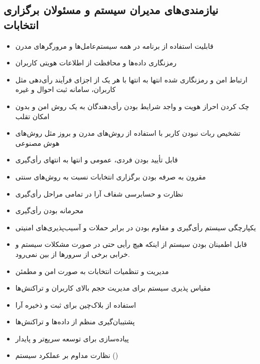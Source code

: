 \documentclass[12pt]{article}
\begin{document}
\subsection{نیازمندی‌های مدیران سیستم و مسئولان برگزاری انتخابات}
\begin{itemize}[leftmargin=*]
\item
قابلیت استفاده از برنامه در همه سیستم‌عامل‌ها و مرورگرهای مدرن
\item
رمزنگاری داده‌ها و محافظت از اطلاعات هویتی کاربران
\item
ارتباط امن و رمزنگاری شده انتها به انتها با هر یک از اجزای فرآیند رأی‌دهی مثل کاربران، سامانه ثبت احوال و غیره 
\item
چک کردن احراز هویت و واجد شرایط بودن رأی‌دهندگان به یک روش امن و بدون امکان تقلب
\item
تشخیص ربات نبودن کاربر با استفاده از روش‌های مدرن و بروز مثل روش‌های هوش مصنوعی
\item
قابل تأیید بودن فردی، عمومی و انتها به انتهای رأی‌گیری
\item
مقرون به صرفه بودن برگزاری انتخابات نسبت به روش‌های سنتی
\item
نظارت و حسابرسی شفاف آرا در تمامی مراحل رأی‌گیری
\item
محرمانه بودن رأی‌گیری 
\item
یکپارچگی سیستم رأی‌گیری و مقاوم بودن در برابر حملات و آسیب‌پذیری‌های امنیتی
\item
قابل اطمینان بودن سیستم از اینکه هیچ رأیی حتی در صورت مشکلات سیستم و خرابی برخی از سرورها از بین نمی‌رود. 
\item
مدیریت و تنظمیات انتخابات به صورت امن و مطمئن
\item
مقیاس پذیری سیستم برای مدیریت حجم بالای کاربران و تراکنش‌ها
\item
استفاده از بلاک‌چین برای ثبت و ذخیره آرا
\item
پشتیبان‌گیری منظم از داده‌ها و تراکنش‌ها
\item
پیاده‌سازی 
برای توسعه سریع‌تر و پایدار
\item
نظارت مداوم بر عملکرد سیستم 
()
\end{itemize}
\end{document}
